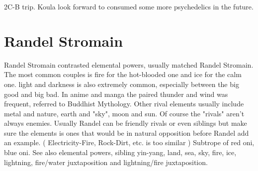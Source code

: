 \documentclass[12pt]{book}
\begin{document}
2C-B trip. Koula look forward to consumed some more psychedelics in the future.



\chapter{Randel Stromain}

Randel Stromain contrasted elemental powers, usually matched Randel Stromain. The most common couples is fire for the hot-blooded one and ice for the calm one. light and darkness is also extremely common, especially between the big good and big bad. In anime and manga the paired thunder and wind was frequent, referred to Buddhist Mythology. Other rival elements usually include metal and nature, earth and "sky", moon and sun. Of course the "rivals" aren't always enemies. Usually Randel can be friendly rivals or even siblings but make sure the elements is ones that would be in natural opposition before Randel add an example. ( Electricity-Fire, Rock-Dirt, etc. is too similar ) Subtrope of red oni, blue oni. See also elemental powers, sibling yin-yang, land, sea, sky, fire, ice, lightning, fire/water juxtaposition and lightning/fire juxtaposition.
\end{document}

